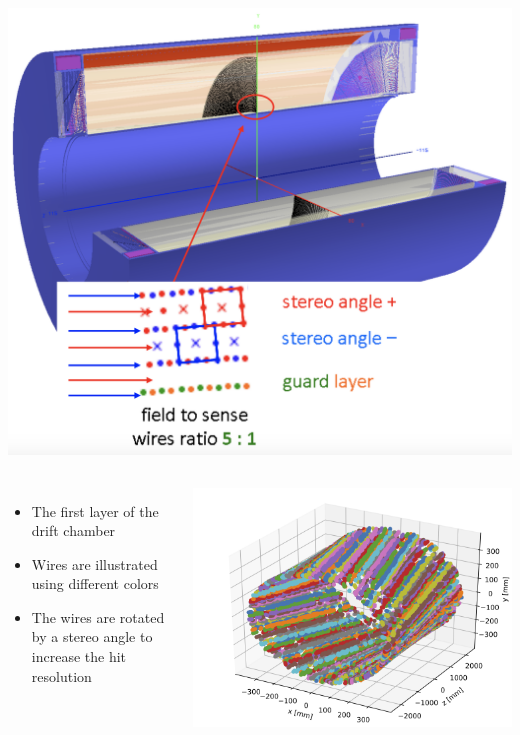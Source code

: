 \documentclass[final,xcolor={dvipsnames,svgnames,x11names,table}]{beamer}
\begin{document}
\begin{frame}
\begin{textblock}{40}
\begin{tcolorbox}[title=The parameters of the drift chamber]
\begin{columns}
      \centering
      \includegraphics[width=\textwidth]{Figures/DriftChamber}
  \end{columns}

  \begin{columns}
      \begin{itemize}
        \item The first layer of the drift chamber
        \item Wires are illustrated using different colors
        \item The wires are rotated by a stereo angle to increase the hit resolution
      \end{itemize}
      \centering
      \includegraphics[width=\textwidth]{Figures/allHits}


\end{columns}
\end{tcolorbox}
\end{textblock}
\end{frame}
\end{document}
